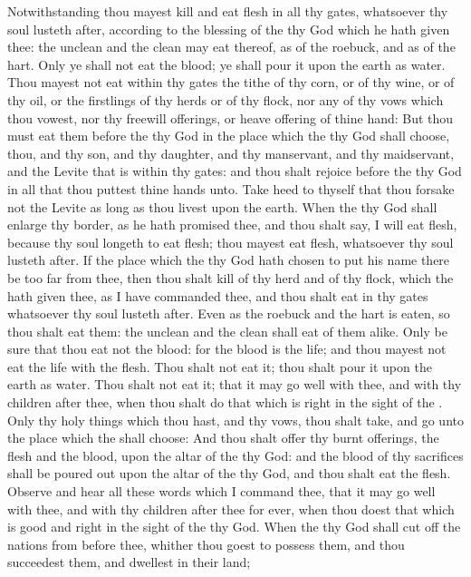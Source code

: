 \begin{biblechapter}
\verse Notwithstanding thou mayest kill and eat flesh in all thy gates, whatsoever thy soul lusteth after, according to the blessing of the \LORD thy God which he hath given thee: the unclean and the clean may eat thereof, as of the roebuck, and as of the hart.
\verse Only ye shall not eat the blood; ye shall pour it upon the earth as water.
\verse Thou mayest not eat within thy gates the tithe of thy corn, or of thy wine, or of thy oil, or the firstlings of thy herds or of thy flock, nor any of thy vows which thou vowest, nor thy freewill offerings, or heave offering of thine hand:
\verse But thou must eat them before the \LORD thy God in the place which the \LORD thy God shall choose, thou, and thy son, and thy daughter, and thy manservant, and thy maidservant, and the Levite that is within thy gates: and thou shalt rejoice before the \LORD thy God in all that thou puttest thine hands unto.
\verse Take heed to thyself that thou forsake not the Levite as long as thou livest upon the earth.
\verse When the \LORD thy God shall enlarge thy border, as he hath promised thee, and thou shalt say, I will eat flesh, because thy soul longeth to eat flesh; thou mayest eat flesh, whatsoever thy soul lusteth after.
\verse If the place which the \LORD thy God hath chosen to put his name there be too far from thee, then thou shalt kill of thy herd and of thy flock, which the \LORD hath given thee, as I have commanded thee, and thou shalt eat in thy gates whatsoever thy soul lusteth after.
\verse Even as the roebuck and the hart is eaten, so thou shalt eat them: the unclean and the clean shall eat of them alike.
\verse Only be sure that thou eat not the blood: for the blood is the life; and thou mayest not eat the life with the flesh.
\verse Thou shalt not eat it; thou shalt pour it upon the earth as water.
\verse Thou shalt not eat it; that it may go well with thee, and with thy children after thee, when thou shalt do that which is right in the sight of the \LORD.
\verse Only thy holy things which thou hast, and thy vows, thou shalt take, and go unto the place which the \LORD shall choose:
\verse And thou shalt offer thy burnt offerings, the flesh and the blood, upon the altar of the \LORD thy God: and the blood of thy sacrifices shall be poured out upon the altar of the \LORD thy God, and thou shalt eat the flesh.
\verse Observe and hear all these words which I command thee, that it may go well with thee, and with thy children after thee for ever, when thou doest that which is good and right in the sight of the \LORD thy God.
\verse When the \LORD thy God shall cut off the nations from before thee, whither thou goest to possess them, and thou succeedest them, and dwellest in their land;

\end{biblechapter}
